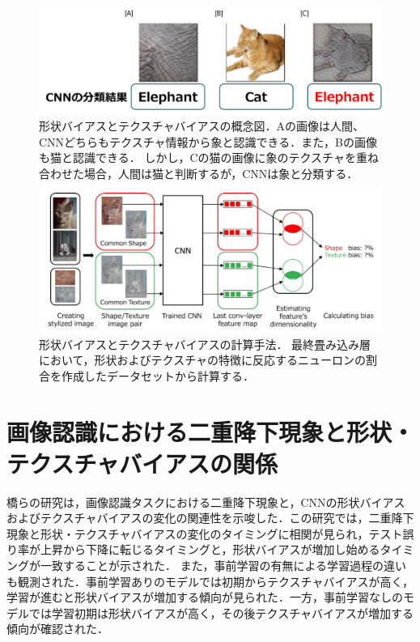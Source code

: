 \begin{figure}[h]
    \centering
    \includegraphics[width=\linewidth]{fig/shapetexturebias.pdf}
    \caption{形状バイアスとテクスチャバイアスの概念図．Aの画像は人間、CNNどちらもテクスチャ情報から象と認識できる．また，Bの画像も猫と認識できる．
    しかし，Cの猫の画像に象のテクスチャを重ね合わせた場合，人間は猫と判断するが，CNNは象と分類する．}
\end{figure}

\begin{figure}[h]
    \centering
    \includegraphics[width=\linewidth]{fig/IslamSTB.pdf}
    \caption{形状バイアスとテクスチャバイアスの計算手法．
    最終畳み込み層において，形状およびテクスチャの特徴に反応するニューロンの割合を作成したデータセットから計算する．}
    \label{fig:IslamSTB}
\end{figure}

\newpage

\section{画像認識における二重降下現象と形状・テクスチャバイアスの関係}

橋らの研究\cite{DD_STB}は，画像認識タスクにおける二重降下現象と，CNNの形状バイアスおよびテクスチャバイアスの変化の関連性を示唆した．この研究では，二重降下現象と形状・テクスチャバイアスの変化のタイミングに相関が見られ，テスト誤り率が上昇から下降に転じるタイミングと，形状バイアスが増加し始めるタイミングが一致することが示された．
また，事前学習の有無による学習過程の違いも観測された．事前学習ありのモデルでは初期からテクスチャバイアスが高く，学習が進むと形状バイアスが増加する傾向が見られた．一方，事前学習なしのモデルでは学習初期は形状バイアスが高く，その後テクスチャバイアスが増加する傾向が確認された．

